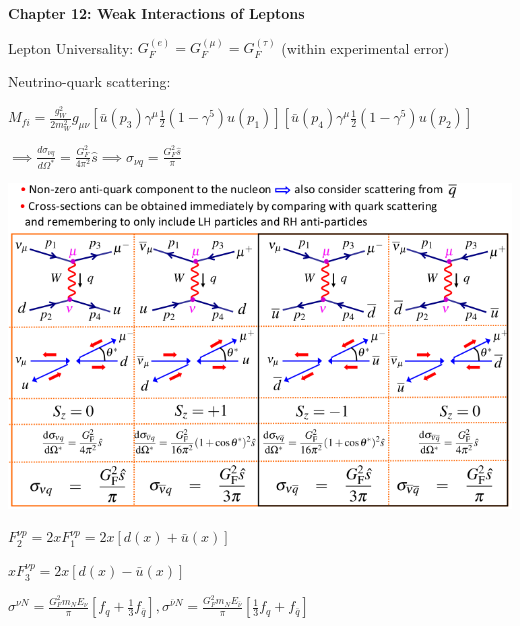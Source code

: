 \textbf{Chapter 12: Weak Interactions of Leptons}

Lepton Universality: $G_F^{(e)} = G_F^{(\mu)} = G_F^{(\tau)}$ (within experimental error)

Neutrino-quark scattering:

$M_{fi} = \frac{g_W^2}{2m_W^2} g_{\mu\nu}\left[\bar{u}(p_3) \gamma^\mu \frac{1}{2}(1 - \gamma^5) u(p_1)\right]\left[\bar{u}(p_4) \gamma^\mu \frac{1}{2}(1 - \gamma^5) u(p_2)\right]$

$\implies \frac{d\sigma_{\nu q}}{d\Omega^*} = \frac{G_F^2}{4\pi^2} \hat{s} \implies \sigma_{\nu q} = \frac{G_F^2\hat{s}}{\pi}$

\begin{center}
    \includegraphics[width=\linewidth]{images/nu_q_scattering.png}
\end{center}

$F_2^{\nu p} = 2xF_1^{\nu p} = 2x[d(x) + \bar{u}(x)]$

$xF_3^{\nu p} = 2x[d(x) - \bar{u}(x)]$

$\sigma^{\nu N} = \frac{G_F^2 m_N E_\nu}{\pi}\left[f_q + \frac{1}{3}f_{\bar{q}}\right], \sigma^{\bar{\nu} N} = \frac{G_F^2 m_N E_{\bar{\nu}}}{\pi}\left[\frac{1}{3}f_q + f_{\bar{q}}\right]$

